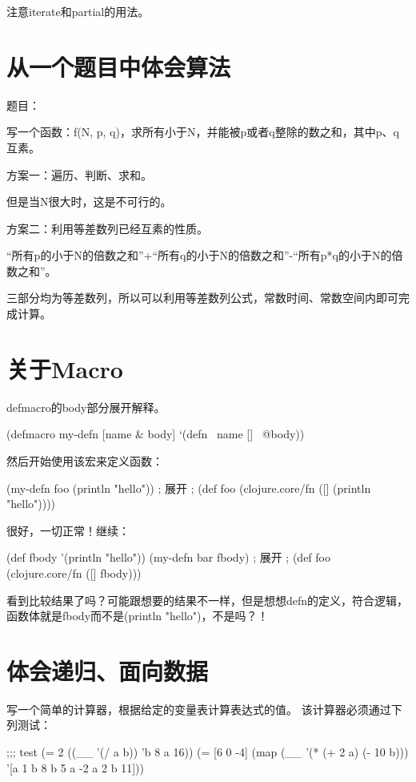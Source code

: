 \documentclass[a4paper,11pt]{article}
\begin{document}
  注意iterate和partial的用法。


  \section[从一个题目中体会算法]{从一个题目中体会算法}
  题目：\par
  写一个函数：f(N, p, q)，求所有小于N，并能被p或者q整除的数之和，其中p、q互素。

  方案一：遍历、判断、求和。\par
  但是当N很大时，这是不可行的。

  方案二：利用等差数列已经互素的性质。\par
  “所有p的小于N的倍数之和”+“所有q的小于N的倍数之和”-“所有p*q的小于N的倍数之和”。

  三部分均为等差数列，所以可以利用等差数列公式，常数时间、常数空间内即可完成计算。


  \section[关于Macro]{关于Macro}
  defmacro的body部分展开解释。
  
  \begin{schemecode}
    (defmacro my-defn
      [name & body]
      `(defn ~name [] ~@body))
  \end{schemecode}

  然后开始使用该宏来定义函数：

  \begin{schemecode}
    (my-defn foo (println "hello"))
    ; 展开
    ; (def foo (clojure.core/fn ([] (println "hello"))))
  \end{schemecode}

  很好，一切正常！继续：

  \begin{schemecode}
    (def fbody '(println "hello"))
    (my-defn bar fbody)
    ; 展开
    ; (def foo (clojure.core/fn ([] fbody)))
  \end{schemecode}

  看到比较结果了吗？可能跟想要的结果不一样，但是想想defn的定义，符合逻辑，
  函数体就是fbody而不是(println "hello")，不是吗？！


  \section[体会递归、面向数据]{体会递归、面向数据}
  写一个简单的计算器，根据给定的变量表计算表达式的值。
  该计算器必须通过下列测试：\par
  \begin{schemecode}
;;; test
(= 2 ((__ '(/ a b))
      '{b 8 a 16}))
(= [6 0 -4]
     (map (__ '(* (+ 2 a)
                     (- 10 b)))
          '[{a 1 b 8}
            {b 5 a -2}
            {a 2 b 11}]))
  \end{schemecode}
  
\end{document}
